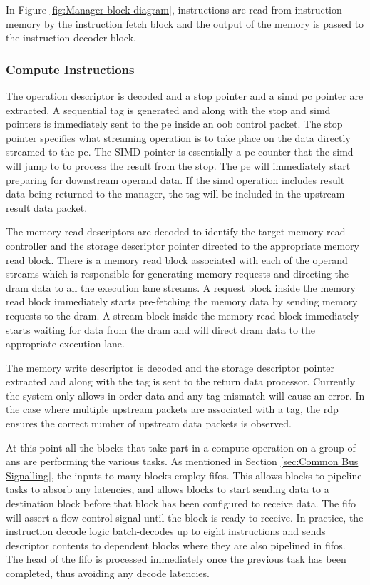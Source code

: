 In Figure \ref{fig:Manager block diagram}, instructions are read from instruction memory by the instruction fetch block and the output of the memory is passed to the instruction decoder block.

\subsubsection{Compute Instructions}
\label{sec:Decoding Compute Instructions}

The operation descriptor is decoded and a \ac{stop} pointer and a \ac{simd} \ac{pc} pointer are extracted. 
A sequential tag is generated and along with the \ac{stop} and \ac{simd} pointers is immediately sent to the \ac{pe} inside an \ac{oob} control packet.
The \ac{stop} pointer specifies what streaming operation is to take place on the data directly streamed to the \ac{pe}. 
The SIMD pointer is essentially a \ac{pc} counter that the \ac{simd} will jump to to process the result from the \ac{stop}.
The \ac{pe} will immediately start preparing for downstream operand data.
If the \ac{simd} operation includes result data being returned to the manager, the tag will be included in the upstream result data packet.

The memory read descriptors are decoded to identify the target memory read controller and the storage descriptor pointer directed to the appropriate memory read block.
There is a memory read block associated with each of the operand streams which is responsible for generating memory requests and directing the \ac{dram} data to all the execution lane streams.
A request block inside the memory read block immediately starts pre-fetching the memory data by sending memory requests to the \ac{dram}.
A stream block inside the memory read block immediately starts waiting for data from the \ac{dram} and will direct \ac{dram} data to the appropriate execution lane.

The memory write descriptor is decoded and the storage descriptor pointer extracted and along with the tag is sent to the return data processor.
Currently the system only allows in-order data and any tag mismatch will cause an error.
In the case where multiple upstream packets are associated with a tag, the \ac{rdp} ensures the correct number of upstream data packets is observed.

At this point all the blocks that take part in a compute operation on a group of \acp{an} are performing the various tasks.
As mentioned in Section \ref{sec:Common Bus Signalling}, the inputs to many blocks employ \acp{fifo}. 
This allows blocks to pipeline tasks to absorb any latencies, and allows blocks to start sending data to a destination block before that block has been configured to receive data.
The \ac{fifo} will assert a flow control signal until the block is ready to receive.
In practice, the instruction decode logic batch-decodes up to eight instructions and sends descriptor contents to dependent blocks where they are also pipelined in \acp{fifo}.
The head of the \ac{fifo} is processed immediately once the previous task has been completed, thus avoiding any decode latencies.

